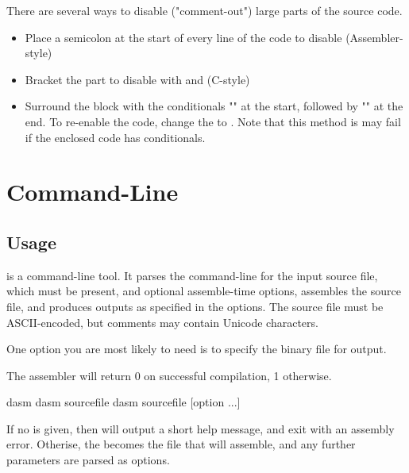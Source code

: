 There are several ways to disable ("comment-out") large parts of the source code.

\begin{itemize}
\item Place a semicolon at the start of every line of the code to disable (Assembler-style)
\item Bracket the part to disable with \mono{/*} and \mono{*/}  (C-style)
\item Surround the block with the conditionals "" at the start, followed by "" at the end. To re-enable the code, change the  to . Note that this method is may fail if the enclosed code has conditionals.
\end{itemize}



\chapter{Command-Line}






\section{Usage}
\dasm is a command-line tool. It parses the command-line for the input source file, which must be present, and optional assemble-time options, assembles the source file, and produces outputs as specified in the options. The source file must be ASCII-encoded, but comments may contain Unicode characters.

One option you are most likely to need is  to specify the binary file for output.

The assembler will return 0 on successful compilation, 1 otherwise.

\begin{usage}
dasm
dasm sourcefile
dasm sourcefile [option ...]
\end{usage}

\label{changelog:20200824sourcefile}
If no  is given, then \dasm will output a short help message, and exit with an assembly error. Otherise, the  becomes the file that \dasm will assemble, and any further parameters are parsed as options.


